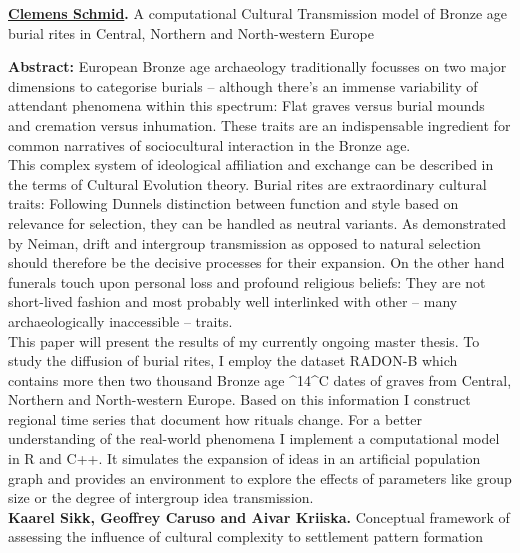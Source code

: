 \documentclass[]{article}
\begin{document}
{\bf \href{https://hcommons.org/members/nevrome/}{Clemens Schmid}. }{A
computational Cultural Transmission model of Bronze age burial rites in
Central, Northern and North-western Europe}

\textbf{Abstract:} European Bronze age archaeology traditionally
focusses on two major dimensions to categorise burials -- although
there's an immense variability of attendant phenomena within this
spectrum: Flat graves versus burial mounds and cremation versus
inhumation. These traits are an indispensable ingredient for common
narratives of sociocultural interaction in the Bronze
age.\\[2\baselineskip]This complex system of ideological affiliation and
exchange can be described in the terms of Cultural Evolution theory.
Burial rites are extraordinary cultural traits: Following Dunnels
distinction between function and style based on relevance for selection,
they can be handled as neutral variants. As demonstrated by Neiman,
drift and intergroup transmission as opposed to natural selection should
therefore be the decisive processes for their expansion. On the other
hand funerals touch upon personal loss and profound religious beliefs:
They are not short-lived fashion and most probably well interlinked with
other -- many archaeologically inaccessible --
traits.\\[2\baselineskip]This paper will present the results of my
currently ongoing master thesis. To study the diffusion of burial rites,
I employ the dataset RADON-B which contains more then two thousand
Bronze age \^{}14\^{}C dates of graves from Central, Northern and
North-western Europe. Based on this information I construct regional
time series that document how rituals change. For a better understanding
of the real-world phenomena I implement a computational model in R and
C++. It simulates the expansion of ideas in an artificial population
graph and provides an environment to explore the effects of parameters
like group size or the degree of intergroup idea transmission.\\

{\bf {Kaarel Sikk, Geoffrey Caruso and Aivar Kriiska}. }{Conceptual
framework of assessing the influence of cultural complexity to
settlement pattern formation}
\end{document}
